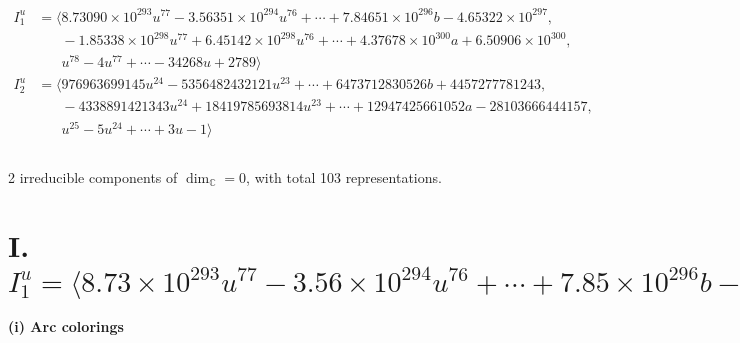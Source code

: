 \documentclass[1p]{elsarticle_modified}
\theoremstyle{definition}
\begin{document}
\begin{align*}
I^u_{1}&=\langle 
8.73090\times10^{293} u^{77}-3.56351\times10^{294} u^{76}+\cdots+7.84651\times10^{296} b-4.65322\times10^{297},\\
\phantom{I^u_{1}}&\phantom{= \langle  }-1.85338\times10^{298} u^{77}+6.45142\times10^{298} u^{76}+\cdots+4.37678\times10^{300} a+6.50906\times10^{300},\\
\phantom{I^u_{1}}&\phantom{= \langle  }u^{78}-4 u^{77}+\cdots-34268 u+2789\rangle \\
I^u_{2}&=\langle 
976963699145 u^{24}-5356482432121 u^{23}+\cdots+6473712830526 b+4457277781243,\\
\phantom{I^u_{2}}&\phantom{= \langle  }-4338891421343 u^{24}+18419785693814 u^{23}+\cdots+12947425661052 a-28103666444157,\\
\phantom{I^u_{2}}&\phantom{= \langle  }u^{25}-5 u^{24}+\cdots+3 u-1\rangle \\
\\
\end{align*}
\raggedright * 2 irreducible components of $\dim_{\mathbb{C}}=0$, with total 103 representations.\\
\newpage
\renewcommand{\arraystretch}{1}
\centering \section*{I. $I^u_{1}= \langle 8.73\times10^{293} u^{77}-3.56\times10^{294} u^{76}+\cdots+7.85\times10^{296} b-4.65\times10^{297},\;-1.85\times10^{298} u^{77}+6.45\times10^{298} u^{76}+\cdots+4.38\times10^{300} a+6.51\times10^{300},\;u^{78}-4 u^{77}+\cdots-34268 u+2789 \rangle$}
\flushleft \textbf{(i) Arc colorings}\\
\end{document}
